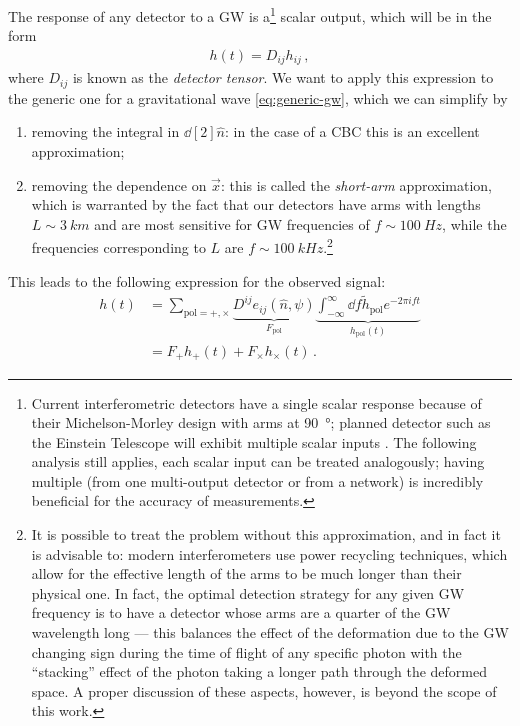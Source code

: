 \documentclass[main.tex]{subfiles}
\begin{document}
The response of any detector to a \ac{GW} is a\footnote{Current interferometric detectors have a single scalar response because of their Michelson-Morley design with arms at \SI{90}{\degree}; planned detector such as the Einstein Telescope will exhibit multiple scalar inputs \cite[section 5.3.2]{etscienceteamEinsteinGravitationalWave2011}. The following analysis still applies, each scalar input can be treated analogously; having multiple (from one multi-output detector or from a network) is incredibly beneficial for the accuracy of measurements.} scalar output, which will be in the form 
%
\begin{align}
h(t) = D_{ij} h_{ij}
\,,
\end{align}
%
where \(D_{ij}\) is known as the \emph{detector tensor}. 
We want to apply this expression to the generic one for a gravitational wave \eqref{eq:generic-gw}, which we can simplify by
\begin{enumerate}
    \item removing the integral in \(\dd[2]{\hat{n}}\): in the case of a \ac{CBC} this is an excellent approximation;
    \item removing the dependence on \(\vec{x}\): this is called the \emph{short-arm} approximation, which is warranted by the fact that our detectors have arms with lengths \(L \sim \SI{3}{km}\) and are most sensitive for \ac{GW} frequencies of \(f \sim \SI{100}{Hz}\), while the frequencies corresponding to \(L\) are \(f \sim
     \SI{100}{kHz}\).\footnote{It is possible to treat the problem without this approximation, and in fact it is advisable to: modern interferometers use power recycling techniques, which allow for the effective length of the arms to be much longer than their physical one. In fact, the optimal detection strategy for any given \ac{GW} frequency is to have a detector whose arms are a quarter of the \ac{GW} wavelength long \cite[eq.\ 9.33]{maggioreGravitationalWavesVolume2007} --- this balances the effect of the deformation due to the \ac{GW} changing sign during the time of flight of any specific photon with the ``stacking'' effect of the photon taking a longer path through the deformed space. A proper discussion of these aspects, however, is beyond the scope of this work.}
\end{enumerate}

This leads to the following expression for the observed signal:
%
\begin{subequations}
\begin{align}
h(t) &= \sum _{\text{pol}= +, \times } \underbrace{D^{ij} e_{ij}(\hat{n}, \psi )}_{F _{\text{pol}}}  \underbrace{\int_{- \infty }^{\infty } \dd{f} \widetilde{h} _{\text{pol}} e^{-2 \pi i f t}}_{h _{\text{pol}}(t)}  \\
&= F_+ h_+ (t) + F_\times h_\times (t)
\,.
\end{align}
\end{subequations}
\end{document}
